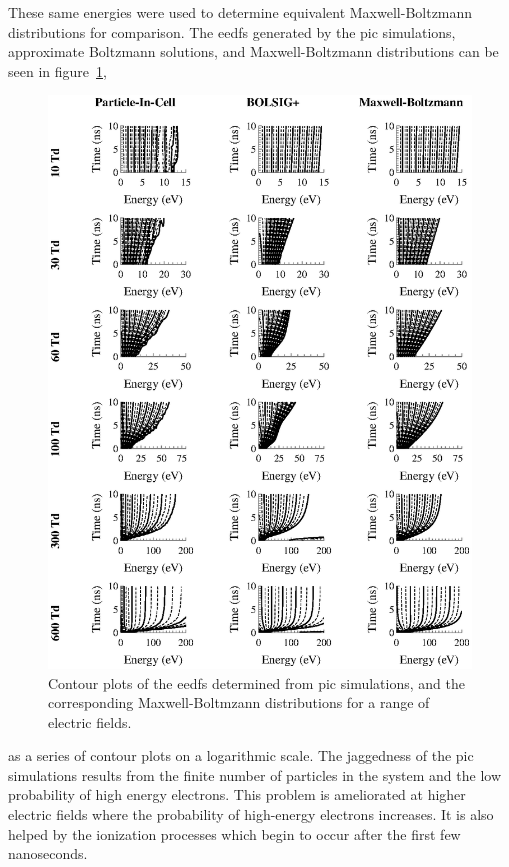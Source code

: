 These same energies were used to determine equivalent Maxwell-Boltzmann
distributions for comparison. The \acs{eedf}s generated by the \acs{pic}
simulations, approximate Boltzmann solutions, and Maxwell-Boltzmann
distributions can be seen in figure~\ref{fig:picmb},
\begin{figure}
  \centering
  \includegraphics{./chapters/modeling/figures/picmb.eps}
  \caption{Contour plots of the \acs{eedf}s determined from \acs{pic}
    simulations, and the corresponding Maxwell-Boltmzann distributions for a range
    of electric fields.}
  \label{fig:picmb}
\end{figure}
as a series of contour plots on a logarithmic scale. The jaggedness of the
\acs{pic} simulations results from the finite number of particles in the system
and the low probability of high energy electrons. This problem is ameliorated at
higher electric fields where the probability of high-energy electrons increases.
It is also helped by the ionization processes which begin to occur after the
first few nanoseconds.

